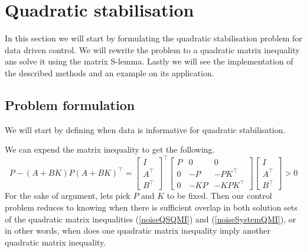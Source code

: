 \section{Quadratic stabilisation} \label{SectionQuadStab}
In this section we will start by formulating the quadratic stabilisation problem for data driven control. We will rewrite the problem to a quadratic matrix inequality ans solve it using the matrix S-lemma. Lastly we will see the implementation of the described methods and an example on its application.

\subsection{Problem formulation}
We will start by defining when data is informative for quadratic stabilisation. %


We can expend the matrix inequality to get the following.
\begin{equation} \label{noiseQSQMI}
P - (A + BK) P (A + BK)^\top = 
\begin{bmatrix} I\\A^\top\\B^\top \end{bmatrix}^\top 
\begin{bmatrix} P&0&0\\0&-P&-PK^\top\\0&-KP&-KPK^\top \end{bmatrix} 
\begin{bmatrix} I\\A^\top\\B^\top \end{bmatrix} > 0
\end{equation}
For the sake of argument, lets pick $P$ and $K$ to be fixed. Then our control problem reduces to knowing when there is sufficient overlap in both solution sets of the quadratic matrix inequalities (\ref{noiseQSQMI}) and (\ref{noiseSystemQMI}), or in other words, when does one quadratic matrix inequality imply another quadratic matrix inequality.


